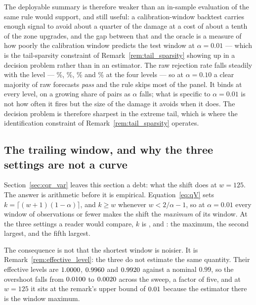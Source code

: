 \documentclass[preprint,11pt,authoryear]{elsarticle}
\newcommand{\1}{\boldsymbol{1}}
\begin{document}
The deployable summary is therefore weaker than an in-sample evaluation of the
same rule would support, and still useful: a calibration-window backtest carries enough
signal to avoid about a quarter of the damage at a cost of about a tenth of the
zone upgrades, and the gap between that and the oracle is a measure of how
poorly the calibration window predicts the test window at $\alpha = 0.01$ ---
which is the tail-sparsity constraint of Remark~\ref{rem:tail_sparsity} showing
up in a decision problem rather than in an estimator. The raw rejection rate
falls steadily with the level --- \nSeqKupiecRejRawOne\%,
\nSeqKupiecRejRawTwoFive\%, \nSeqKupiecRejRawFive\% and
\nSeqKupiecRejRawTen\% at the four levels --- so at $\alpha = 0.10$ a clear
majority of raw forecasts \emph{pass} and the rule skips most of the panel. It
binds at every level, on a growing share of pairs as $\alpha$ falls; what is
specific to $\alpha = 0.01$ is not how often it fires but the size of the damage
it avoids when it does. The decision problem is therefore sharpest in the extreme
tail, which is where the identification constraint of
Remark~\ref{rem:tail_sparsity} operates.

\subsection{The trailing window, and why the three settings are not a curve}
\label{sec:window}

Section~\ref{sec:cqr_var} leaves this section a debt: what the shift does at
$w = 125$. The answer is arithmetic before it is empirical. Equation~\eqref{eq:qV}
sets $k = \lceil (w+1)(1-\alpha)\rceil$, and $k \ge w$ whenever
$w < 2/\alpha - 1$, so at $\alpha = 0.01$ every window of \nWSweepBound{}
observations or fewer makes the shift the \emph{maximum} of its window. At the
three settings a reader would compare, $k$ is \nWSweepShortK, \nWSweepMidK{} and
\nWSweepLongK: the maximum, the second largest, and the fifth largest.

The consequence is not that the shortest window is noisier. It is
Remark~\ref{rem:effective_level}: the three do not estimate the same quantity.
Their effective levels are $1.0000$, $0.9960$ and
$0.9920$ against a nominal $0.99$, so the overshoot falls from
$0.0100$ to $0.0020$ across the sweep, a factor of
five, and at $w = 125$ it sits at the remark's upper bound of
$0.01$ because the estimator there is the window maximum.
\end{document}
